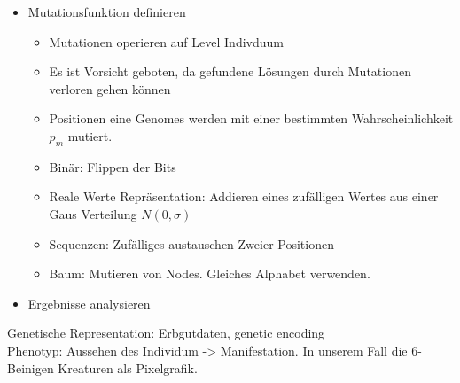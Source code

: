 \begin{itemize}
        \item Mutationsfunktion definieren
          \begin{itemize}
            \item Mutationen operieren auf Level Indivduum
            \item Es ist Vorsicht geboten, da gefundene Lösungen durch Mutationen verloren gehen können
            \item Positionen eine Genomes werden mit einer bestimmten Wahrscheinlichkeit \(p_{m}\) mutiert.
            \item Binär: Flippen der Bits
            \item Reale Werte Repräsentation: Addieren eines zufälligen Wertes aus einer Gaus Verteilung \(N(0,\sigma)\)
            \item Sequenzen: Zufälliges austauschen Zweier Positionen
            \item Baum: Mutieren von Nodes. Gleiches Alphabet verwenden.
          \end{itemize}

        \item Ergebnisse analysieren
      \end{itemize}

      Genetische Representation: Erbgutdaten, genetic encoding \\
      Phenotyp: Aussehen des Individum -> Manifestation. In unserem Fall die 6-Beinigen Kreaturen als Pixelgrafik. \\

